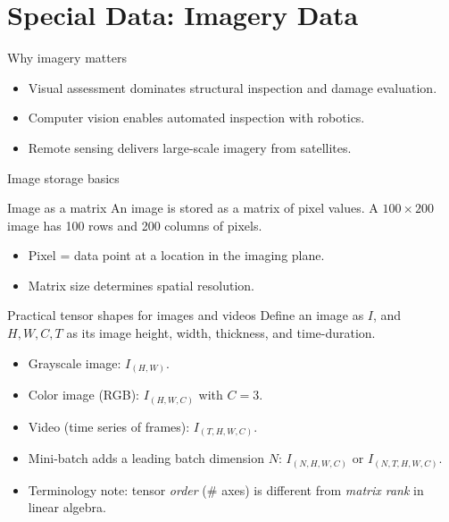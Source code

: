 \documentclass[12pt]{beamer}
\begin{document}
\section{Special Data: Imagery Data}

\begin{frame}{Why imagery matters}
  \begin{itemize}
    \item Visual assessment dominates structural inspection and damage evaluation.
    \item Computer vision enables automated inspection with robotics.
    \item Remote sensing delivers large-scale imagery from satellites.
  \end{itemize}
\end{frame}

\begin{frame}{Image storage basics}
  \begin{conceptbox}{Image as a matrix}
    An image is stored as a matrix of pixel values. A $100 \times 200$ image has
    100 rows and 200 columns of pixels.
  \end{conceptbox}
  \begin{itemize}
    \item Pixel = data point at a location in the imaging plane.
    \item Matrix size determines spatial resolution.
  \end{itemize}
\end{frame}

\begin{frame}{Practical tensor shapes for images and videos}
Define an image as $I$, and $H, W, C, T$ as its image height, width, thickness, and time-duration. 
  \begin{itemize}
    \item Grayscale image: $I_{(H,W)}$.
    \item Color image (RGB): $I_{(H,W,C)}$ with $C=3$.
    \item Video (time series of frames): $I_{(T,H,W,C)}$.
    \item Mini-batch adds a leading batch dimension $N$: $I_{(N,H,W,C)}$ or $I_{(N,T,H,W,C)}$.
    \item Terminology note: tensor \textit{order} (\# axes) is different from \textit{matrix rank} in linear algebra.
  \end{itemize}
\end{frame}
\end{document}
